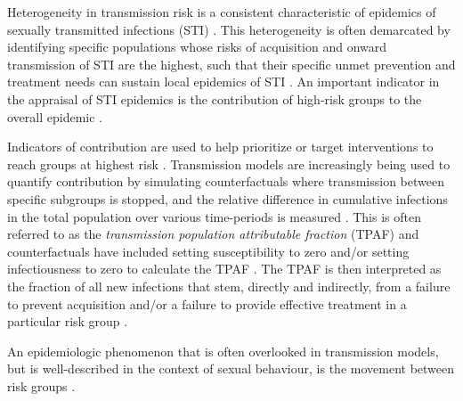 Heterogeneity in transmission risk is a consistent characteristic of
epidemics of sexually transmitted infections (STI) \citep{Anderson1991}.
This heterogeneity is often demarcated by identifying
specific populations whose risks of acquisition and onward transmission of STI are the highest,
such that their specific unmet prevention and treatment needs
can sustain local epidemics of STI \citep{Yorke1978}.
An important indicator in the appraisal of STI epidemics is
the contribution of high-risk groups to the overall epidemic \citep{Case2012}.
\par
Indicators of contribution are used to help prioritize or target interventions
to reach groups at highest risk \citep{Case2012,Shubber2014}.
Transmission models are increasingly being used to quantify
contribution by simulating counterfactuals where transmission 
between specific subgroups is stopped, and
the relative difference in cumulative infections in the total population
over various time-periods is measured \citep{Mishra2016,Mukandavire2018}.
This is often referred to as the
\textit{transmission population attributable fraction} (TPAF)
and counterfactuals have included
setting susceptibility to zero and/or setting 
infectiousness to zero to calculate the TPAF \citep{Mishra2012}.
The TPAF is then interpreted as
the fraction of all new infections that stem, directly and indirectly, from
a failure to prevent acquisition and/or
a failure to provide effective treatment in a particular risk group \citep{Mishra2016}.
\par
An epidemiologic phenomenon that is often overlooked in transmission models,
but is well-described in the context of sexual behaviour,
is the movement between risk groups \citep{Watts2010}.
